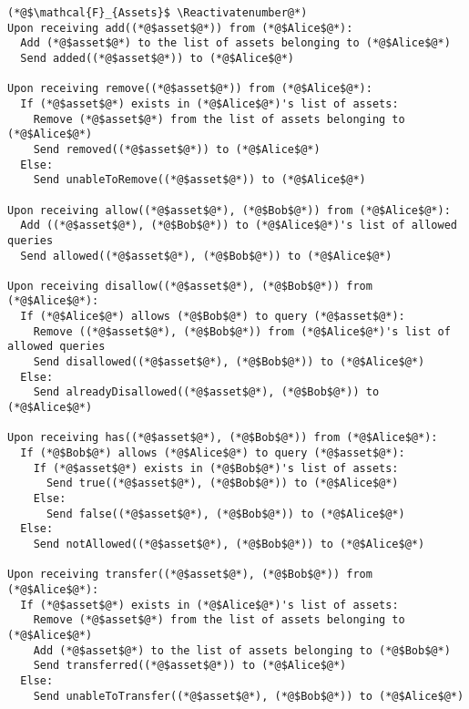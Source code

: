 \Suppressnumber
\begin{lstlisting}[label=assetsfunc, style=numbers]
(*@$\mathcal{F}_{Assets}$ \Reactivatenumber@*)
Upon receiving add((*@$asset$@*)) from (*@$Alice$@*):
  Add (*@$asset$@*) to the list of assets belonging to (*@$Alice$@*)
  Send added((*@$asset$@*)) to (*@$Alice$@*)

Upon receiving remove((*@$asset$@*)) from (*@$Alice$@*):
  If (*@$asset$@*) exists in (*@$Alice$@*)'s list of assets:
    Remove (*@$asset$@*) from the list of assets belonging to (*@$Alice$@*)
    Send removed((*@$asset$@*)) to (*@$Alice$@*)
  Else:
    Send unableToRemove((*@$asset$@*)) to (*@$Alice$@*)

Upon receiving allow((*@$asset$@*), (*@$Bob$@*)) from (*@$Alice$@*):
  Add ((*@$asset$@*), (*@$Bob$@*)) to (*@$Alice$@*)'s list of allowed queries
  Send allowed((*@$asset$@*), (*@$Bob$@*)) to (*@$Alice$@*)

Upon receiving disallow((*@$asset$@*), (*@$Bob$@*)) from (*@$Alice$@*):
  If (*@$Alice$@*) allows (*@$Bob$@*) to query (*@$asset$@*):
    Remove ((*@$asset$@*), (*@$Bob$@*)) from (*@$Alice$@*)'s list of allowed queries
    Send disallowed((*@$asset$@*), (*@$Bob$@*)) to (*@$Alice$@*)
  Else:
    Send alreadyDisallowed((*@$asset$@*), (*@$Bob$@*)) to (*@$Alice$@*)

Upon receiving has((*@$asset$@*), (*@$Bob$@*)) from (*@$Alice$@*):
  If (*@$Bob$@*) allows (*@$Alice$@*) to query (*@$asset$@*):
    If (*@$asset$@*) exists in (*@$Bob$@*)'s list of assets:
      Send true((*@$asset$@*), (*@$Bob$@*)) to (*@$Alice$@*)
    Else:
      Send false((*@$asset$@*), (*@$Bob$@*)) to (*@$Alice$@*)
  Else:
    Send notAllowed((*@$asset$@*), (*@$Bob$@*)) to (*@$Alice$@*)

Upon receiving transfer((*@$asset$@*), (*@$Bob$@*)) from (*@$Alice$@*):
  If (*@$asset$@*) exists in (*@$Alice$@*)'s list of assets:
    Remove (*@$asset$@*) from the list of assets belonging to (*@$Alice$@*)
    Add (*@$asset$@*) to the list of assets belonging to (*@$Bob$@*)
    Send transferred((*@$asset$@*)) to (*@$Alice$@*)
  Else:
    Send unableToTransfer((*@$asset$@*), (*@$Bob$@*)) to (*@$Alice$@*)
\end{lstlisting}
